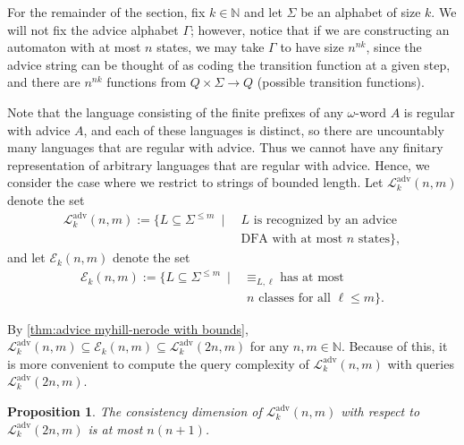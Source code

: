 \documentclass[11pt,a4paper]{amsart}
\newtheorem{proposition}{Proposition}
\theoremstyle{definition}
\newcommand{\bb}{\mathbb}
\newcommand{\mc}{\mathcal}
\begin{document}
For the remainder of the section, fix $k \in \bb N$ and let $\Sigma$ be an alphabet of size $k$. 
We will not fix the advice alphabet $\Gamma$; however, notice that if we are constructing an automaton with at most $n$ states, we may take $\Gamma$ to have size $n^{nk}$, since the advice string can be thought of as coding the transition function at a given step, and there are $n^{nk}$ functions from $Q \times \Sigma \to Q$ (possible transition functions). 

Note that the language consisting of the finite prefixes of any $\omega$-word $A$ is regular with advice $A$, and each of these languages is distinct, so there are uncountably many languages that are regular with advice.
Thus we cannot have any finitary representation of arbitrary languages that are regular with advice.
Hence, we consider the case where we restrict to strings of bounded length.
Let $\mc L^{\text{adv}}_k(n,m)$ denote the set 
\begin{align*}
    \mc L^{\text{adv}}_k(n,m) := \{L \subseteq \Sigma^{\leq m} \ \mid \ &L \text{ is recognized by an advice} \\
    &\text{DFA with at most } n \text{ states}\},
\end{align*}
and let $\mc E_k(n,m)$ denote the set
\begin{align*}
  \mc E_k(n,m) := \{L \subseteq \Sigma^{\leq m}  \ \mid \ &\equiv_{L,\ell} \text{ has at most } \\
  &n \text{ classes for all } \ell \leq m\}.
\end{align*}

By \autoref{thm:advice myhill-nerode with bounds}, $\mc L^{\text{adv}}_k(n,m) \subseteq \mc E_k(n,m) \subseteq \mc L^{\text{adv}}_k(2n,m)$ for any $n,m \in \bb N$. 
Because of this, it is more convenient to compute the query complexity of $\mc L^{\text{adv}}_k(n,m)$ with queries $\mc L^{\text{adv}}_k(2n,m)$. 

\begin{proposition} \label{prop:Cdim of DFAs with advice}
  The consistency dimension of $\mc L^{\text{adv}}_k(n,m)$ with respect to \\$\mc L^{\text{adv}}_k(2n,m)$ is at most $n(n+1)$.
\end{proposition}
\end{document}
